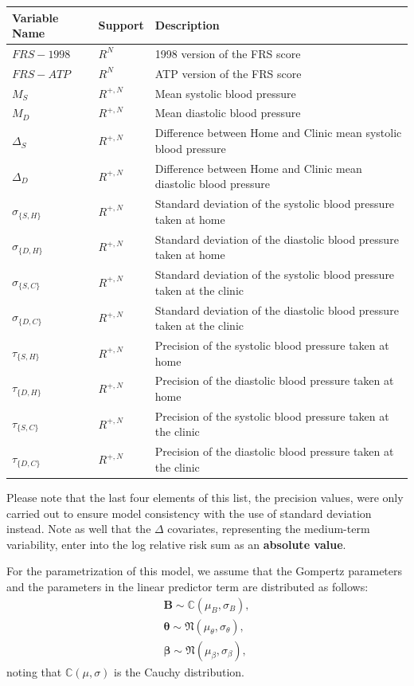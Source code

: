 \documentclass[
]{article}
\begin{document}
\begin{tabular}{lll}
\toprule
Variable Name & Support & Description\\
\midrule
$FRS-1998$ & $R^N$ & 1998 version of the FRS score\\
$FRS-ATP$ & $R^N$ & ATP version of the FRS score\\
$M_S$ & $R^{+,N}$ & Mean systolic blood pressure\\
$M_D$ & $R^{+,N}$ & Mean diastolic blood pressure\\
$\Delta_S$ & $R^{+,N}$ & Difference between Home and Clinic mean systolic blood pressure\\
\addlinespace
$\Delta_D$ & $R^{+,N}$ & Difference between Home and Clinic mean diastolic blood pressure\\
$\sigma_{\{S,H\}}$ & $R^{+,N}$ & Standard deviation of the systolic blood pressure taken at home\\
$\sigma_{\{D,H\}}$ & $R^{+,N}$ & Standard deviation of the diastolic blood pressure taken at home\\
$\sigma_{\{S,C\}}$ & $R^{+,N}$ & Standard deviation of the systolic blood pressure taken at the clinic\\
$\sigma_{\{D,C\}}$ & $R^{+,N}$ & Standard deviation of the diastolic blood pressure taken at the clinic\\
\addlinespace
$\tau_{\{S,H\}}$ & $R^{+,N}$ & Precision of the systolic blood pressure taken at home\\
$\tau_{\{D,H\}}$ & $R^{+,N}$ & Precision of the diastolic blood pressure taken at home\\
$\tau_{\{S,C\}}$ & $R^{+,N}$ & Precision of the systolic blood pressure taken at the clinic\\
$\tau_{\{D,C\}}$ & $R^{+,N}$ & Precision of the diastolic blood pressure taken at the clinic\\
\bottomrule
\end{tabular}

Please note that the last four elements of this list, the precision
values, were only carried out to ensure model consistency with the use
of standard deviation instead. Note as well that the \(\Delta\)
covariates, representing the medium-term variability, enter into the log
relative risk sum as an \textbf{absolute value}.

For the parametrization of this model, we assume that the Gompertz
parameters and the parameters in the linear predictor term are
distributed as follows: \begin{equation}\label{priorsS}
\begin{aligned}
  \boldsymbol{B}\sim\mathbb{C}(\mu_B,\sigma_B),\\
  \boldsymbol{\theta}\sim\mathfrak{N}(\mu_\theta,\sigma_\theta),\\
  \boldsymbol{\beta}\sim \mathfrak{N}(\mu_\beta,\sigma_\beta),
\end{aligned}
\end{equation} noting that \(\mathbb{C}(\mu,\sigma)\) is the Cauchy
distribution.
\end{document}

